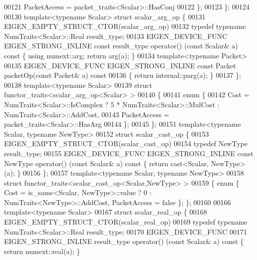 \begin{DoxyCode}
00121     PacketAccess = packet\_traits<Scalar>::HasConj
00122   \};
00123 \};
00124 
00130 \textcolor{keyword}{template}<\textcolor{keyword}{typename} Scalar> \textcolor{keyword}{struct }scalar\_arg\_op \{
00131   EIGEN\_EMPTY\_STRUCT\_CTOR(scalar\_arg\_op)
00132   \textcolor{keyword}{typedef} \textcolor{keyword}{typename} NumTraits<Scalar>::Real result\_type;
00133   EIGEN\_DEVICE\_FUNC EIGEN\_STRONG\_INLINE \textcolor{keyword}{const} result\_type operator() (\textcolor{keyword}{const} Scalar& a)\textcolor{keyword}{ const }\{ \textcolor{keyword}{using} 
      numext::arg; \textcolor{keywordflow}{return} arg(a); \}
00134   \textcolor{keyword}{template}<\textcolor{keyword}{typename} Packet>
00135   EIGEN\_DEVICE\_FUNC EIGEN\_STRONG\_INLINE \textcolor{keyword}{const} Packet packetOp(\textcolor{keyword}{const} Packet& a)\textcolor{keyword}{ const}
00136 \textcolor{keyword}{  }\{ \textcolor{keywordflow}{return} internal::parg(a); \}
00137 \};
00138 \textcolor{keyword}{template}<\textcolor{keyword}{typename} Scalar>
00139 \textcolor{keyword}{struct }functor\_traits<scalar\_arg\_op<Scalar> >
00140 \{
00141   \textcolor{keyword}{enum} \{
00142     Cost = NumTraits<Scalar>::IsComplex ? 5 * NumTraits<Scalar>::MulCost : NumTraits<Scalar>::AddCost,
00143     PacketAccess = packet\_traits<Scalar>::HasArg
00144   \};
00145 \};
00151 \textcolor{keyword}{template}<\textcolor{keyword}{typename} Scalar, \textcolor{keyword}{typename} NewType>
00152 \textcolor{keyword}{struct }scalar\_cast\_op \{
00153   EIGEN\_EMPTY\_STRUCT\_CTOR(scalar\_cast\_op)
00154   \textcolor{keyword}{typedef} NewType result\_type;
00155   EIGEN\_DEVICE\_FUNC EIGEN\_STRONG\_INLINE \textcolor{keyword}{const} NewType operator() (\textcolor{keyword}{const} Scalar& a)\textcolor{keyword}{ const }\{ \textcolor{keywordflow}{return} 
      cast<Scalar, NewType>(a); \}
00156 \};
00157 \textcolor{keyword}{template}<\textcolor{keyword}{typename} Scalar, \textcolor{keyword}{typename} NewType>
00158 \textcolor{keyword}{struct }functor\_traits<scalar\_cast\_op<Scalar,NewType> >
00159 \{ \textcolor{keyword}{enum} \{ Cost = is\_same<Scalar, NewType>::value ? 0 : NumTraits<NewType>::AddCost, PacketAccess = \textcolor{keyword}{false} \}; 
      \};
00160 
00166 \textcolor{keyword}{template}<\textcolor{keyword}{typename} Scalar>
00167 \textcolor{keyword}{struct }scalar\_real\_op \{
00168   EIGEN\_EMPTY\_STRUCT\_CTOR(scalar\_real\_op)
00169   \textcolor{keyword}{typedef} \textcolor{keyword}{typename} NumTraits<Scalar>::Real result\_type;
00170   EIGEN\_DEVICE\_FUNC
00171   EIGEN\_STRONG\_INLINE result\_type operator() (\textcolor{keyword}{const} Scalar& a)\textcolor{keyword}{ const }\{ \textcolor{keywordflow}{return} numext::real(a); \}

\end{DoxyCode}
